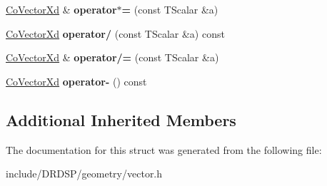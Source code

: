 \begin{DoxyCompactItemize}
\item 
\hypertarget{struct_d_r_d_s_p_1_1_co_vector_xd_a03f9355148d74d76fc9c1cdad0fcd454}{\hyperlink{struct_d_r_d_s_p_1_1_co_vector_xd}{Co\-Vector\-Xd} \& {\bfseries operator$\ast$=} (const T\-Scalar \&a)}\label{struct_d_r_d_s_p_1_1_co_vector_xd_a03f9355148d74d76fc9c1cdad0fcd454}

\item 
\hypertarget{struct_d_r_d_s_p_1_1_co_vector_xd_ad65659fe00cceee8514ff6b0fa80f6d9}{\hyperlink{struct_d_r_d_s_p_1_1_co_vector_xd}{Co\-Vector\-Xd} {\bfseries operator/} (const T\-Scalar \&a) const }\label{struct_d_r_d_s_p_1_1_co_vector_xd_ad65659fe00cceee8514ff6b0fa80f6d9}

\item 
\hypertarget{struct_d_r_d_s_p_1_1_co_vector_xd_ad7db0fcdf937e4f4cdc601caf3bae63d}{\hyperlink{struct_d_r_d_s_p_1_1_co_vector_xd}{Co\-Vector\-Xd} \& {\bfseries operator/=} (const T\-Scalar \&a)}\label{struct_d_r_d_s_p_1_1_co_vector_xd_ad7db0fcdf937e4f4cdc601caf3bae63d}

\item 
\hypertarget{struct_d_r_d_s_p_1_1_co_vector_xd_af309a5d3ad0374d1378d9e4af4b12e4f}{\hyperlink{struct_d_r_d_s_p_1_1_co_vector_xd}{Co\-Vector\-Xd} {\bfseries operator-\/} () const }\label{struct_d_r_d_s_p_1_1_co_vector_xd_af309a5d3ad0374d1378d9e4af4b12e4f}

\end{DoxyCompactItemize}
\subsection*{Additional Inherited Members}


The documentation for this struct was generated from the following file\-:\begin{DoxyCompactItemize}
\item 
include/\-D\-R\-D\-S\-P/geometry/vector.\-h\end{DoxyCompactItemize}
